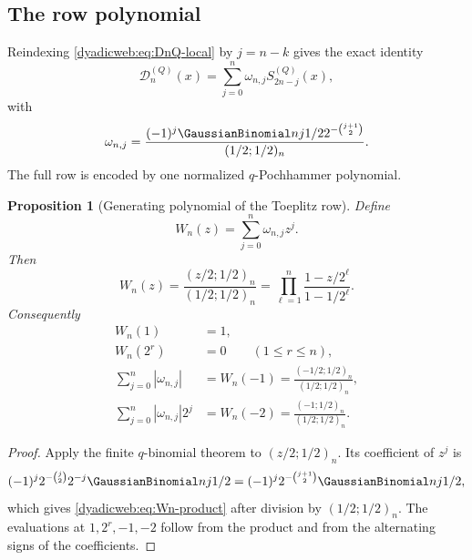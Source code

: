 \documentclass[11pt,oneside]{article}
\newtheorem{proposition}[proposition]{Proposition}
\theoremstyle{definition}
\theoremstyle{remark}
\begin{document}
\subsection{The row polynomial}

Reindexing \eqref{dyadicweb:eq:DnQ-local} by $j=n-k$ gives the exact identity
\begin{equation}
 \mathcal D_n^{(Q)}(x)=
 \sum_{j=0}^{n}\omega_{n,j}S_{2n-j}^{(Q)}(x),              \label{dyadicweb:eq:D-toeplitz-local}
\end{equation}
with
\begin{equation}
 \omega_{n,j}=
 \frac{(-1)^j\GaussianBinomial nj{1/2}2^{-\binom{j+1}{2}}}
 {(1/2;1/2)_n}.                                           \label{dyadicweb:eq:omega-local}
\end{equation}
The full row is encoded by one normalized $q$-Pochhammer polynomial.

\begin{proposition}[Generating polynomial of the Toeplitz row]
\label{dyadicweb:prop:Wn}
Define
\begin{equation}
 W_n(z)=\sum_{j=0}^{n}\omega_{n,j}z^j.                    \label{dyadicweb:eq:Wn-def}
\end{equation}
Then
\begin{equation}
 \boxed{
 W_n(z)=\frac{(z/2;1/2)_n}{(1/2;1/2)_n}
 =\prod_{\ell=1}^{n}\frac{1-z/2^\ell}{1-1/2^\ell}.}      \label{dyadicweb:eq:Wn-product}
\end{equation}
Consequently
\begin{align}
 W_n(1)&=1,                                                \label{dyadicweb:eq:Wn-one}\\
 W_n(2^r)&=0\qquad(1\le r\le n),                         \label{dyadicweb:eq:Wn-roots}\\
 \sum_{j=0}^{n}|\omega_{n,j}|
 &=W_n(-1)=\frac{(-1/2;1/2)_n}{(1/2;1/2)_n},              \label{dyadicweb:eq:Wn-variation}\\
 \sum_{j=0}^{n}|\omega_{n,j}|2^j
 &=W_n(-2)=\frac{(-1;1/2)_n}{(1/2;1/2)_n}.                \label{dyadicweb:eq:Wn-weighted-variation}
\end{align}
\end{proposition}

\begin{proof}
Apply the finite $q$-binomial theorem to $(z/2;1/2)_n$.  Its coefficient of $z^j$ is
\[
 (-1)^j2^{-\binom j2}2^{-j}\GaussianBinomial nj{1/2}
 =(-1)^j2^{-\binom{j+1}{2}}\GaussianBinomial nj{1/2},
\]
which gives \eqref{dyadicweb:eq:Wn-product} after division by $(1/2;1/2)_n$.  The evaluations at
$1,2^r,-1,-2$ follow from the product and from the alternating signs of the coefficients.
\end{proof}
\end{document}
